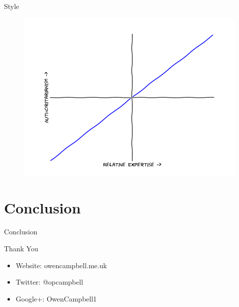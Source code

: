 \documentclass{beamer}
\begin{document}
    \begin{frame}{Style}
      \begin{figure}
          \includegraphics[scale=0.5]{images/style}
        \end{figure}
    \end{frame}

  \section{Conclusion}

    \begin{frame}{Conclusion}
    \end{frame}

    \begin{frame}{Thank You}
      \begin{itemize}
        \item Website: owencampbell.me.uk
        \item Twitter: @opcampbell
        \item Google+: OwenCampbell1
      \end{itemize}
    \end{frame}
\end{document}

